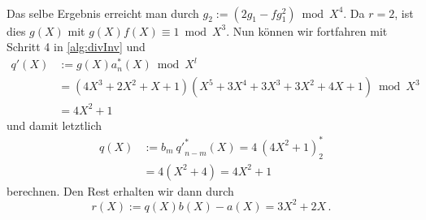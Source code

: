 \begin{beispiel}
\begin{tabular}{lrll}
  \end{tabular}\\
  Das selbe Ergebnis erreicht man durch $g_2 := (2g_1 - fg_1^2) \bmod X^4$.
  Da $r=2$, ist dies $g(X)$ mit $g(X)f(X) \equiv 1 \bmod X^3$.
  Nun können wir fortfahren mit Schritt 4 in \autoref{alg:divInv} und 
  \begin{align*}
    q'(X) &:= g(X) a^\ast_n(X) \bmod X^l\\
    &= (4X^3+2X^2+X+1)(X^5+3X^4+3X^3 + 3X^2 + 4X + 1) \bmod X^3\\
    &= 4X^2 + 1
  \end{align*}
  und damit letztlich
  \begin{align*}
    q(X) &:= b_m\ {q'}^\ast_{n-m}(X) = 4\ (4X^2+1)^\ast_{2} \\
    &= 4 (X^2 + 4) = 4X^2 + 1
  \end{align*}
  berechnen. Den Rest erhalten wir dann durch 
  \[ r(X) := q(X)b(X) - a(X) = 3X^2 + 2X\,. \]
\end{beispiel}


